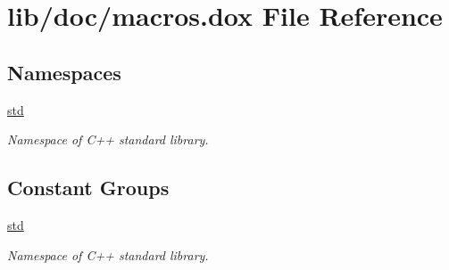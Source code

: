 \hypertarget{macros_8dox}{\section{lib/doc/macros.dox File Reference}
\label{macros_8dox}
}
\subsection*{Namespaces}
\begin{DoxyCompactItemize}
\item 
\hyperlink{namespacestd}{std}
\begin{DoxyCompactList}\small\item\em Namespace of C++ standard library. \end{DoxyCompactList}\end{DoxyCompactItemize}
\subsection*{Constant Groups}
\begin{DoxyCompactItemize}
\item 
\hyperlink{namespacestd}{std}
\begin{DoxyCompactList}\small\item\em Namespace of C++ standard library. \end{DoxyCompactList}\end{DoxyCompactItemize}
